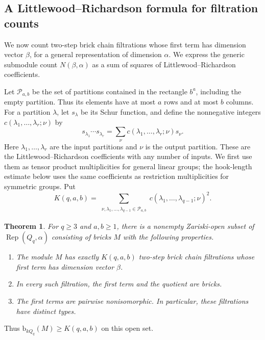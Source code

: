 \documentclass[a4paper,reqno,10pt]{amsart}
\newtheorem{theorem}{Theorem}[section]
\theoremstyle{definition}
\numberwithin{equation}{section}
\newcommand{\Rep}{\operatorname{Rep}}
\newcommand{\parts}{\mathcal P}
\newcommand{\bcount}{\mathrm b}
\begin{document}
\subsection{A Littlewood--Richardson formula for filtration counts}

We now count two-step brick chain filtrations whose first term has
dimension vector $\beta$, for a general representation of dimension
$\alpha$. We express the generic submodule count $N(\beta,\alpha)$
as a sum of squares of Littlewood--Richardson coefficients.

Let $\parts_{a,b}$ be the set of partitions
contained in the rectangle $b^a$, including the empty partition.
Thus its elements have at most $a$ rows and at most $b$ columns.
For a partition $\lambda$, let $s_\lambda$ be its Schur function, and
define the nonnegative integers $c(\lambda_1,\ldots,\lambda_r;\nu)$ by
\[
s_{\lambda_1}\cdots s_{\lambda_r}
   =\sum_\nu c(\lambda_1,\ldots,\lambda_r;\nu)s_\nu.
\]
Here $\lambda_1,\ldots,\lambda_r$ are the input partitions and $\nu$ is
the output partition. These are the Littlewood--Richardson coefficients
with any number of inputs. We first use them as tensor product
multiplicities for general linear groups; the hook-length estimate below uses
the same coefficients as restriction multiplicities for symmetric
groups. Put
\begin{equation}\label{eq:K}
 K(q,a,b)=
 \sum_{\substack{\nu,\lambda_1,\ldots,\lambda_{q-1}\in\parts_{a,b}}}
 c(\lambda_1,\ldots,\lambda_{q-1};\nu)^2.
\end{equation}

\begin{theorem}\label{thm:count}
For $q\geq3$ and $a,b\geq1$, there is a nonempty Zariski-open subset of
$\Rep(Q_q,\alpha)$ consisting of bricks $M$ with the following properties.
\begin{enumerate}
\item\label{item:filtration-count} The module $M$ has exactly $K(q,a,b)$
two-step brick chain filtrations whose first term has dimension vector
$\beta$.
\item\label{item:brick-factors} In every such filtration, the first term and the quotient are bricks.
\item\label{item:distinct-types} The first terms are pairwise nonisomorphic. In particular, these
filtrations have distinct types.
\end{enumerate}
\end{theorem}

Thus $\bcount_{k Q_q}(M)\geq K(q,a,b)$ on this open set.
\end{document}
